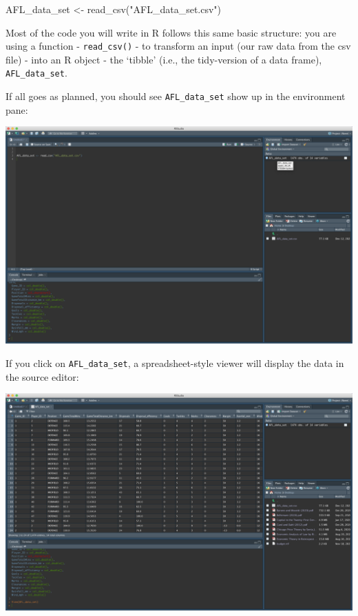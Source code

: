 \documentclass[
]{article}
\newenvironment{Shaded}{\begin{snugshade}}{\end{snugshade}}
\newcommand{\FunctionTok}[1]{\textcolor[rgb]{0.00,0.00,0.00}{#1}}
\newcommand{\NormalTok}[1]{#1}
\newcommand{\OtherTok}[1]{\textcolor[rgb]{0.56,0.35,0.01}{#1}}
\newcommand{\StringTok}[1]{\textcolor[rgb]{0.31,0.60,0.02}{#1}}
\begin{document}
\begin{Shaded}
\begin{Highlighting}[]
\NormalTok{AFL\_data\_set }\OtherTok{\textless{}{-}} \FunctionTok{read\_csv}\NormalTok{(}\StringTok{"AFL\_data\_set.csv"}\NormalTok{)}
\end{Highlighting}
\end{Shaded}

Most of the code you will write in R follows this same basic structure:
you are using a function - \texttt{read\_csv()} - to transform an input
(our raw data from the csv file) - into an R object - the `tibble'
(i.e., the tidy-version of a data frame), \texttt{AFL\_data\_set}.

If all goes as planned, you should see \texttt{AFL\_data\_set} show up
in the environment pane:

\includegraphics{Images/enviro_pane.png}

If you click on \texttt{AFL\_data\_set}, a spreadsheet-style viewer will
display the data in the source editor:

\includegraphics{Images/viewer.png}
\end{document}
